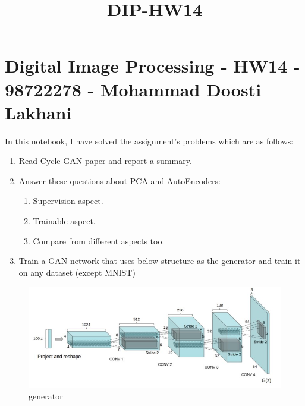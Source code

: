 \documentclass[11pt]{article}
\title{DIP-HW14}
\makeatletter
\def\maxwidth{\ifdim\Gin@nat@width>\linewidth\linewidth
    \else\Gin@nat@width\fi}
\let\Oldincludegraphics\includegraphics
\renewcommand{\includegraphics}[1]{\Oldincludegraphics[width=.8\maxwidth]{#1}}
\providecommand{\tightlist}{%
      \setlength{\itemsep}{0pt}\setlength{\parskip}{0pt}}
\makeatother
\begin{document}
    
    
    \maketitle
    
    

    
    \hypertarget{digital-image-processing---hw14---98722278---mohammad-doosti-lakhani}{%
\section{Digital Image Processing - HW14 - 98722278 - Mohammad Doosti
Lakhani}\label{digital-image-processing---hw14---98722278---mohammad-doosti-lakhani}}

In this notebook, I have solved the assignment's problems which are as
follows:

\begin{enumerate}
\def\labelenumi{\arabic{enumi}.}
\tightlist
\item
  Read \href{https://arxiv.org/abs/1703.10593}{Cycle GAN} paper and
  report a summary.
\item
  Answer these questions about PCA and AutoEncoders:

  \begin{enumerate}
  \def\labelenumii{\arabic{enumii}.}
  \tightlist
  \item
    Supervision aspect.
  \item
    Trainable aspect.
  \item
    Compare from different aspects too.
  \end{enumerate}
\item
  Train a GAN network that uses below structure as the generator and
  train it on any dataset (except MNIST)
\end{enumerate}

\begin{figure}
\centering
\includegraphics{wiki/3_1.jpg}
\caption{generator}
\end{figure}
\end{document}
